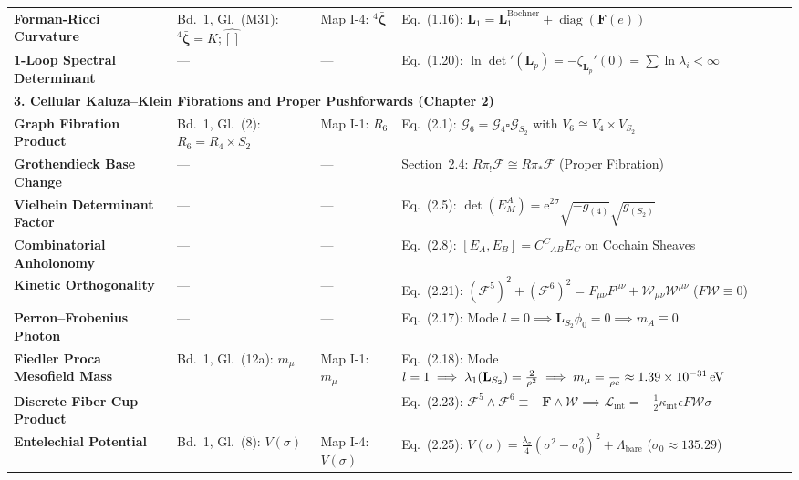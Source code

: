\documentclass[
    12pt,
    a4paper,
    headings=normal,
    twoside=false,
    open=any,
    parskip=half
]{scrbook}
\let\hbar\relax
\newcommand{\eu}{\mathrm{e}}
\begin{document}
\begin{longtable}{p{3.4cm}p{3.2cm}p{3.2cm}p{5.4cm}}
\textbf{Forman-Ricci Curvature} & Bd.~1, Gl.~(M31): ${}^4\bar{\boldsymbol{\zeta}} = K;\hat{[]}$ & Map I-4: ${}^4\bar{\boldsymbol{\zeta}}$ & Eq.~(1.16): $\mathbf{L}_1 = \mathbf{L}_1^{\text{Bochner}} + \operatorname{diag}(\mathbf{F}(e))$ \\
\textbf{1-Loop Spectral Determinant}& — & — & Eq.~(1.20): $\ln\det'(\mathbf{L}_p) = -\zeta_{\mathbf{L}_p}'(0) = \sum \ln\lambda_i < \infty$ \\\midrule
\multicolumn{4}{l}{\textsf{\textbf{\color{maincolor!90!black}3. Cellular Kaluza--Klein Fibrations and Proper Pushforwards (Chapter 2)}}} \\\midrule
\textbf{Graph Fibration Product} & Bd.~1, Gl.~(2): $R_6 = R_4 \times S_2$ & Map I-1: $R_6$ & Eq.~(2.1): $\mathcal{G}_6 = \mathcal{G}_4 \square \mathcal{G}_{S_2}$ with $V_6 \cong V_4 \times V_{S_2}$ \\
\textbf{Grothendieck Base Change} & — & — & Section~2.4: $R\pi_! \mathscr{F} \cong R\pi_* \mathscr{F}$ (Proper Fibration) \\
\textbf{Vielbein Determinant Factor} & — & — & Eq.~(2.5): $\det(E^A_M) = \eu^{2\sigma}\sqrt{-g_{(4)}}\sqrt{g_{(S_2)}}$ \\
\textbf{Combinatorial Anholonomy} & — & — & Eq.~(2.8): $[E_A, E_B] = C^C_{\phantom{C}AB} E_C$ on Cochain Sheaves \\
\textbf{Kinetic Orthogonality} & — & — & Eq.~(2.21): $(\mathcal{F}^5)^2 + (\mathcal{F}^6)^2 = F_{\mu\nu}F^{\mu\nu} + \mathcal{W}_{\mu\nu}\mathcal{W}^{\mu\nu}$ ($F\mathcal{W} \equiv 0$) \\
\textbf{Perron--Frobenius Photon} & — & — & Eq.~(2.17): Mode $l=0 \implies \mathbf{L}_{S_2}\phi_0 = 0 \implies m_A \equiv 0$ \\
\textbf{Fiedler Proca Mesofield Mass}& Bd.~1, Gl.~(12a): $m_\mu$ & Map I-1: $m_\mu$ & Eq.~(2.18): Mode $l=1 \implies \lambda_1(\mathbf{L}_{S_2}) = \frac{2}{\rho^2} \implies m_\mu = \frac{\hbar}{\rho c} \approx 1.39 \times 10^{-31}\,\text{eV}$ \\
\textbf{Discrete Fiber Cup Product} & — & — & Eq.~(2.23): $\mathcal{F}^5 \wedge \mathcal{F}^6 \equiv -\mathbf{F} \wedge \boldsymbol{\mathcal{W}} \implies \mathcal{L}_{\text{int}} = -\frac{1}{2}\kappa_{\text{int}}\epsilon F \mathcal{W} \sigma$ \\
\textbf{Entelechial Potential} & Bd.~1, Gl.~(8): $V(\sigma)$ & Map I-4: $V(\sigma)$ & Eq.~(2.25): $V(\sigma) = \frac{\lambda_\sigma}{4}(\sigma^2 - \sigma_0^2)^2 + \Lambda_{\text{bare}}$ ($\sigma_0 \approx 135.29$) \\\midrule

\end{longtable}
\end{document}
